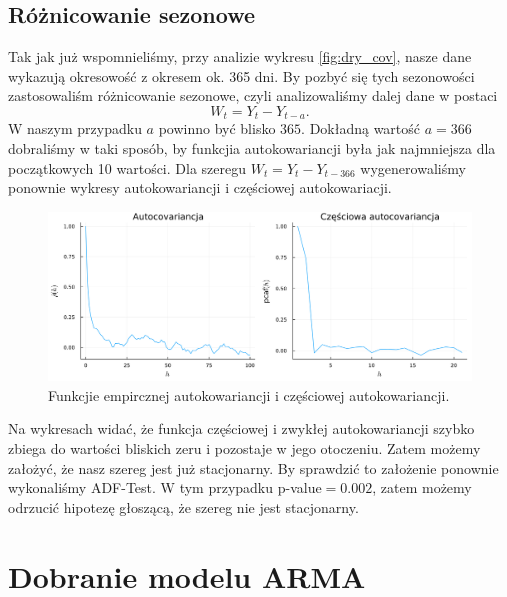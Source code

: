 \documentclass[12pt]{article}
\theoremstyle{exer}
\begin{document}
	\subsection{Różnicowanie sezonowe}
	Tak jak już wspomnieliśmy, przy analizie wykresu \autoref{fig:dry_cov}, nasze dane wykazują okresowość z okresem ok. 365 dni. By pozbyć się tych sezonowości zastosowaliśm różnicowanie sezonowe, czyli analizowaliśmy dalej dane w postaci
	\begin{equation}
		W_t=Y_t-Y_{t-a}.
	\end{equation}
	W naszym przypadku $a$ powinno być blisko $365$. Dokładną wartość $a=366$ dobraliśmy w taki sposób, by funkcjia autokowariancji była jak najmniejsza dla początkowych 10 wartości. Dla szeregu $W_t=Y_t-Y_{t-366}$ wygenerowaliśmy ponownie wykresy autokowariancji i częściowej autokowariacji.
	\begin{figure}[H]\label{fig:wet_cov}
		\includegraphics[width=\columnwidth]{Budnik/img/auto_wet.png}
		\caption{Funkcjie empircznej autokowariancji i częściowej autokowariancji.}
	\end{figure}
	Na wykresach widać, że funkcja częściowej i zwykłej autokowariancji szybko zbiega do wartości bliskich zeru i pozostaje w jego otoczeniu. Zatem możemy założyć, że nasz szereg jest już stacjonarny. By sprawdzić to założenie ponownie wykonaliśmy ADF-Test. W tym przypadku p-value$=0.002$, zatem możemy odrzucić hipotezę głoszącą, że szereg nie jest stacjonarny.
	
	
	\section{Dobranie modelu ARMA}
\end{document}
